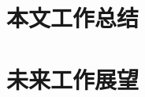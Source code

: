 \documentclass[lang=chs, degree=master, blindreview=false, winfonts=true]{yanputhesis}
\begin{document}
\section{本文工作总结}


\section{未来工作展望}




\backmatter                                                 %
%
\end{document}
